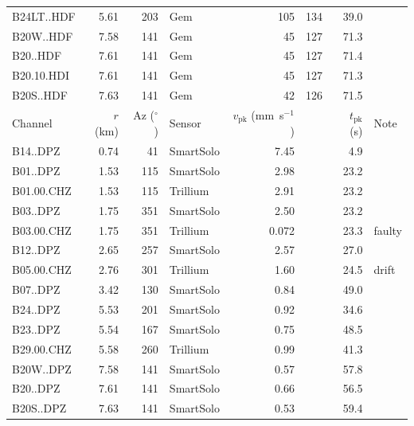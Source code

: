 \begin{table}[p]
\begin{tabular}{lrrlrrrl}
  B24LT..HDF & 5.61 & 203 & Gem & 105 & 134 & 39.0 &  \\
  B20W..HDF & 7.58 & 141 & Gem & 45 & 127 & 71.3 &  \\
  B20..HDF & 7.61 & 141 & Gem & 45 & 127 & 71.4 &  \\
  B20.10.HDI & 7.61 & 141 & Gem & 45 & 127 & 71.3 &  \\
  B20S..HDF & 7.63 & 141 & Gem & 42 & 126 & 71.5 &  \\
  \midrule
  Channel & $r$ (km) & Az ($^{\circ}$) & Sensor & $v_\text{pk}$ (mm~s$^{-1}$) & & $t_\text{pk}$ (s) & Note \\
  \midrule
  B14..DPZ & 0.74 & 41 & SmartSolo & 7.45 &  & 4.9 &  \\
  B01..DPZ & 1.53 & 115 & SmartSolo & 2.98 &  & 23.2 &  \\
  B01.00.CHZ & 1.53 & 115 & Trillium & 2.91 &  & 23.2 &  \\
  B03..DPZ & 1.75 & 351 & SmartSolo & 2.50 &  & 23.2 &  \\
  B03.00.CHZ & 1.75 & 351 & Trillium & 0.072 &  & 23.3 & faulty \\
  B12..DPZ & 2.65 & 257 & SmartSolo & 2.57 &  & 27.0 &  \\
  B05.00.CHZ & 2.76 & 301 & Trillium & 1.60 &  & 24.5 & drift \\
  B07..DPZ & 3.42 & 130 & SmartSolo & 0.84 &  & 49.0 &  \\
  B24..DPZ & 5.53 & 201 & SmartSolo & 0.92 &  & 34.6 &  \\
  B23..DPZ & 5.54 & 167 & SmartSolo & 0.75 &  & 48.5 &  \\
  B29.00.CHZ & 5.58 & 260 & Trillium & 0.99 &  & 41.3 &  \\
  B20W..DPZ & 7.58 & 141 & SmartSolo & 0.57 &  & 57.8 &  \\
  B20..DPZ & 7.61 & 141 & SmartSolo & 0.66 &  & 56.5 &  \\
  B20S..DPZ & 7.63 & 141 & SmartSolo & 0.53 &  & 59.4 &  \\
  \bottomrule
  \end{tabular}
\end{table}
